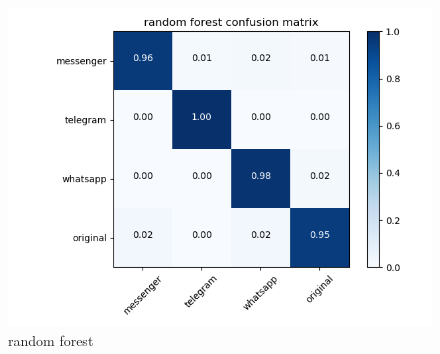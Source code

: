  \begin{figure}[H] 
\centering 
\includegraphics[scale=.6]{images/new_met_random_total.png} 
\caption{random forest} 
\end{figure} 
